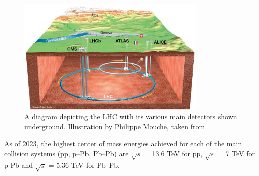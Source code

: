 \begin{figure}
    \centering
    \includegraphics[width=0.8\textwidth]{figures/experiment/lhcring_illustration.jpeg}
    \caption{A diagram depicting the LHC with its various main detectors shown underground. Illustration by Philippe Mouche, taken from~\cite{LHCBBC}}
    \label{fig:lhcring}
\end{figure}
As of 2023, the highest center of mass energies achieved for each of the main collision systems (pp, p--Pb, Pb--Pb) are $\sqrt{s}$ = 13.6 TeV for pp, $\sqrt{s}$ = 7 TeV for p-Pb and $\sqrt{s}$ = 5.36 TeV for Pb--Pb. 

